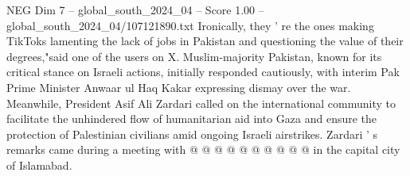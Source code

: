 \begin{textsample}{NEG Dim 7 – global\_south\_2024\_04 – Score 1.00 – global\_south\_2024\_04/107121890.txt}
Ironically, they ' re the ones making TikToks lamenting the lack of jobs in Pakistan and questioning the value of their degrees,"said one of the users on X.
Muslim-majority Pakistan, known for its critical stance on Israeli actions, initially responded cautiously, with interim Pak Prime Minister Anwaar ul Haq Kakar expressing dismay over the war.
Meanwhile, President Asif Ali Zardari called on the international community to facilitate the unhindered flow of humanitarian aid into Gaza and ensure the protection of Palestinian civilians amid ongoing Israeli airstrikes.
Zardari ' s remarks came during a meeting with @ @ @ @ @ @ @ @ @ @ in the capital city of Islamabad.

\end{textsample}
